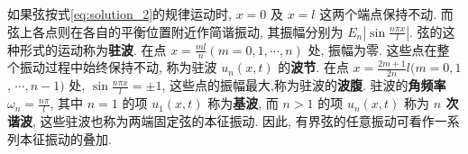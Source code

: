 \begin{enumerate}
        如果弦按式\eqref{eq:solution_2}的规律运动时, 
        $x=0$ 及 $x=l$ 这两个端点保持不动. 
        而弦上各点则在各自的平衡位置附近作简谐振动, 
        其振幅分别为 $E_{n}\left|\sin \frac{n \pi x}{l}\right|$. 
        弦的这种形式的运动称为\textbf{驻波}. 
        在点 $x=\frac{m l}{n}(m=0,1, \cdots, n)$ 处, 振幅为零. 
        这些点在整个振动过程中始终保持不动, 称为驻波 $u_{n}(x, t)$ 的\textbf{波节}. 
        在点 $x=\frac{2 m+1}{2 n} l(m=0,1$, $\cdots, n-1)$ 处, 
        $\sin \frac{n \pi x}{l}= \pm 1$, 这些点的振幅最大,称为驻波的\textbf{波腹}.
         驻波的\textbf{角频率} $\omega_{n}=\frac{n \pi}{l}$, 
         其中 $n=1$ 的项 $u_{1}(x, t)$ 称为\textbf{基波}, 
         而 $n>1$ 的项 $u_{n}(x, t)$ 称为 \textbf{$n$ 次谐波}, 
         这些驻波也称为两端固定弦的本征振动. 
         因此, 有界弦的任意振动可看作一系列本征振动的叠加.
        
\end{enumerate}




